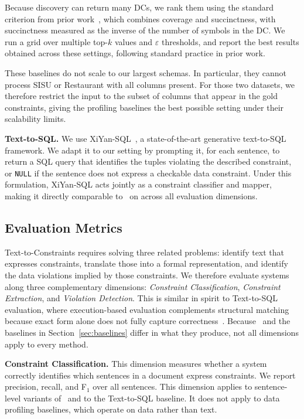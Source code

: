 Because discovery can return many DCs, we rank them using the standard
criterion from prior work~\cite{chu2013discovering}, which combines coverage
and succinctness, with succinctness measured as the inverse of the number of
symbols in the DC. We run a grid over multiple top-$k$ values and
$\varepsilon$ thresholds, and report the best results obtained across these settings, following standard practice in prior work.

These baselines do not scale to our largest schemas. In particular, they
cannot process SISU or Restaurant with all columns present. For those two
datasets, we therefore restrict the input to the subset of columns that appear
in the gold constraints, giving the profiling baselines the best possible
setting under their scalability limits.


\smallskip\noindent\textbf{Text-to-SQL.}
We use XiYan-SQL~\cite{XiYanSQL}, a state-of-the-art generative text-to-SQL
framework. We adapt it to our setting by prompting it, for each sentence, to
return a SQL query that identifies the tuples violating the described
constraint, or \texttt{NULL} if the sentence does not express a checkable data
constraint. Under this formulation, XiYan-SQL acts jointly as a constraint
classifier and mapper, making it directly comparable to \system\ on  across all
evaluation dimensions.


\subsection{Evaluation Metrics}
\label{sec:metrics}

Text-to-Constraints requires solving three related problems: identify
text that expresses constraints, translate those into a formal
representation, and identify the data violations implied by those constraints.
We therefore evaluate systems along three complementary dimensions:
\textit{Constraint Classification}, \textit{Constraint Extraction}, and
\textit{Violation Detection}. This is similar in spirit to Text-to-SQL evaluation, where
execution-based evaluation complements structural matching because exact form
alone does not fully capture correctness~\cite{zhong-etal-2020-semantic}. Because \system\ and the
baselines in Section~\ref{sec:baselines} differ in what they produce, not all
dimensions apply to every method.

\smallskip\noindent\textbf{Constraint Classification.}
This dimension measures whether a system correctly identifies which sentences
in a document express constraints. We report precision, recall, and F$_1$
over all sentences. This dimension applies to sentence-level variants of
\system\ and to the Text-to-SQL baseline. It does not apply to data profiling
baselines, which operate on data rather than text\DIFdelbegin {}\DIFdelend .

